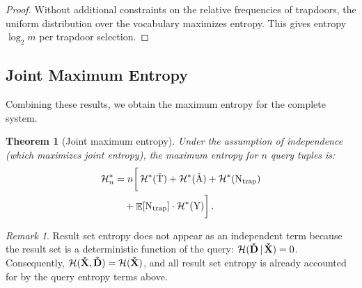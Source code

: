 \documentclass[final,11pt]{article}
\newcommand{\rvhrs}[1][]{%
   \ifthenelse{ \equal{#1}{} }
      {\ensuremath{\rv{\vec{\check{D}}}}}
      {\ensuremath{\rv{\vec{\check{D}_{#1}}}}}
}
\newcommand{\rvhqb}[1][]{%
   \ifthenelse{ \equal{#1}{} }
      {\ensuremath{\rv{\vec{\check{X}}}}}
      {\ensuremath{\rv{\vec{\check{X}_{#1}}}}}
}
\newcommand{\rvhts}[1][]{%
   \ifthenelse{ \equal{#1}{} }
      {\ensuremath{\rv{\check{T}}}}
      {\ensuremath{\rv{\check{T}_{#1}}}}
}
\newcommand{\rvhsa}[1][]{%
   \ifthenelse{ \equal{#1}{} }
      {\ensuremath{\rv{\check{A}}}}
      {\ensuremath{\rv{\check{A}_{#1}}}}
}
\newcommand{\rv}[1]{\mathrm{#1}}
\newcommand{\entropy}{\operatorname{\mathcal{H}}}
\newcommand{\given}{{\,|\,}}
\renewcommand{\vec}[1]{\boldsymbol{\mathbf{#1}}}
\DeclareMathOperator{\expectation}{\mathbb{E}}
\numberwithin{equation}{section}
\theoremstyle{plain}
\newtheorem{theorem}{Theorem}[section]
\theoremstyle{remark}
\newtheorem*{remark}{Remark}
\begin{document}
\begin{proof}
Without additional constraints on the relative frequencies of trapdoors, the uniform distribution over the vocabulary maximizes entropy. This gives entropy $\log_2 m$ per trapdoor selection.
\end{proof}


\subsection{Joint Maximum Entropy}
Combining these results, we obtain the maximum entropy for the complete system.

\begin{theorem}[Joint maximum entropy]
Under the assumption of independence (which maximizes joint entropy), the maximum entropy for $n$ query tuples is:
\begin{equation}
\begin{split}
    \entropy^*_n &= n \bigg[ \entropy^*(\rvhts) + \entropy^*(\rvhsa) + \entropy^*(\rv{N_{\text{trap}}}) \\
    &\quad + \expectation[\rv{N_{\text{trap}}}] \cdot \entropy^*(\rv{Y}) \bigg]\,.
\end{split}
\end{equation}
\end{theorem}

\begin{remark}
Result set entropy does not appear as an independent term because the result set is a deterministic function of the query: $\entropy(\rvhrs \given \rvhqb) = 0$. Consequently, $\entropy(\rvhqb, \rvhrs) = \entropy(\rvhqb)$, and all result set entropy is already accounted for by the query entropy terms above.
\end{remark}
\end{document}

